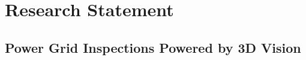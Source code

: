 
%

\chapter{Research Statement}\label{cha:statement}


\section{Power Grid Inspections Powered by 3D Vision}\label{sec:ts40k}

